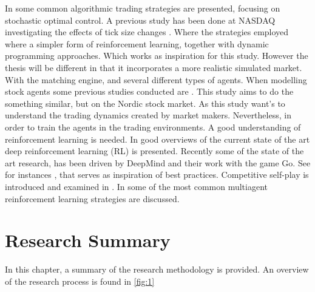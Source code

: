 \documentclass{kththesis}
\theoremstyle{definition}
\begin{document}
\newline
\newline
In \textcite{cartea2015algorithmic} some common algorithmic trading strategies are presented, focusing on stochastic optimal control.
A previous study has been done at NASDAQ investigating the effects of tick size changes \textcite{darley2007nasdaq}. Where the strategies employed where a simpler form of reinforcement learning, together with dynamic programming approaches. Which works as inspiration for this study. However the thesis will be different in that it incorporates a more realistic simulated market. With the matching engine, and several different types of agents. When modelling stock agents some previous studies conducted are \parencite{pastore2015modelling, rutkauskas2009building}. This study aims to do the something similar, but on the Nordic stock market. As this study want's to understand the trading dynamics created by market makers. 
\newline
\newline
Nevertheless, in order to train the agents in the trading environments. A good understanding of reinforcement learning is needed. In \parencite{arulkumaran2017brief, mnih2015human, li2017deep} good overviews of the current state of the art deep reinforcement learning (RL) is presented.  Recently some of the state of the art research, has been driven by DeepMind and their work with the game Go. See for instances \parencite{silver2016mastering, silver2017mastering, vinyals2017starcraft}, that serves as inspiration of best practices. Competitive self-play is introduced and examined in \parencite{bansal2017emergent, schulman2017proximal}. In \parencite{busoniu2008comprehensive, bucsoniu2010multi} some of the most common multiagent reinforcement learning strategies are discussed. 

\chapter{Research Summary}\label{ch:4}
In this chapter, a summary of the research methodology is provided. An overview of the research process is found in \autoref{fig:1}
\end{document}
